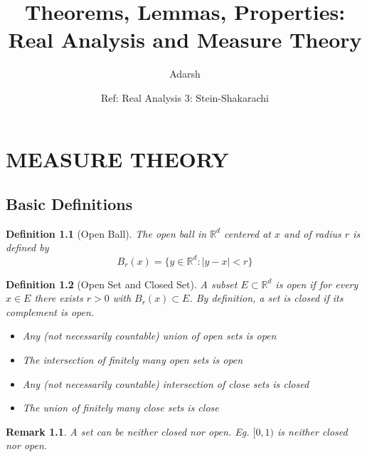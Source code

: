 \documentclass{report}
\title{Theorems, Lemmas, Properties: Real Analysis and Measure Theory}
\author{Adarsh}
\date{Ref: Real Analysis 3: Stein-Shakarachi}
\theoremstyle{upthm}
\newtheorem{defn}{Definition}
\newtheorem{remark}{Remark}
\newcommand{\reals}{\mathbb{R}}
\newcommand{\set}[1]{\big\lbrace #1 \big\rbrace}
\begin{document}
\maketitle

\chapter{MEASURE THEORY}
\section{Basic Definitions}
\begin{defn}[Open Ball]
	The open ball in $\reals^d$ centered at $x$ and of radius $r$ is defined by
	$$B_r(x) = \set{y \in \reals^d : | y - x | < r}$$
\end{defn}
\begin{defn}[Open Set and Closed Set]
	A subset $E \subset \reals^d$ is open if for every $x \in E$ there exists $r > 0$ with
	$B_r(x) \subset E$. By definition, a set is closed if its complement is open. 
	\begin{itemize}
		\item Any (not necessarily countable) union of open sets is open
		\item The intersection of finitely many open sets is open
		\item Any (not necessarily countable) intersection of close sets is closed
		\item The union of finitely many close sets is close
	\end{itemize}
\end{defn}
\begin{remark}
	A set can be neither closed nor open. Eg. $\Big[0, 1\Big)$ is neither closed nor open.
\end{remark}
\end{document}
